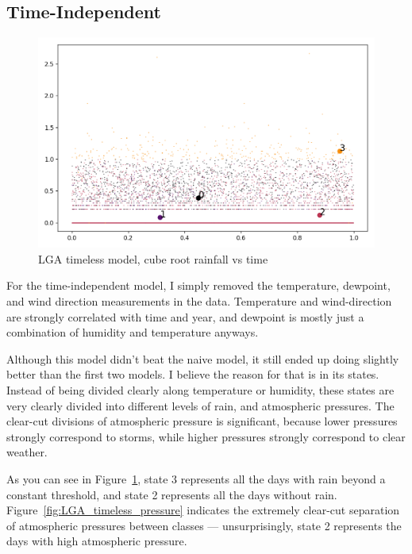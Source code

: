 \documentclass[a4paper]{article}
\begin{document}
\subsection{Time-Independent}
\begin{figure}[t]
  \centering
  \includegraphics[width=\linewidth]{../png/models/LGA-timeless-cuberootrain4.png}
  \caption{LGA timeless model, cube root rainfall vs time}
  \label{fig:LGA_timeless_rain}
\end{figure}

For the time-independent model, I simply removed the temperature, dewpoint, and wind direction measurements in the data. Temperature and wind-direction are strongly correlated with time and year, and dewpoint is mostly just a combination of humidity and temperature anyways. 

Although this model didn't beat the naive model, it still ended up doing slightly better than the first two models. I believe the reason for that is in its states. Instead of being divided clearly along temperature or humidity, these states are very clearly divided into different levels of rain, and atmospheric pressures. The clear-cut divisions of atmospheric pressure is significant, because lower pressures strongly correspond to storms, while higher pressures strongly correspond to clear weather. 

As you can see in Figure~\ref{fig:LGA_timeless_rain}, state 3 represents all the days with rain beyond a constant threshold, and state 2 represents all the days without rain. Figure~\ref{fig:LGA_timeless_pressure} indicates the extremely clear-cut separation of atmospheric pressures between classes --- unsurprisingly, state 2 represents the days with high atmospheric pressure.
\end{document}

